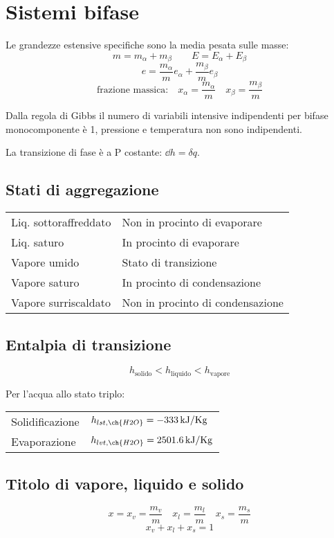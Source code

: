 \section{Sistemi bifase}

Le grandezze estensive specifiche sono la media pesata sulle masse:
\[m = m_\alpha + m_\beta \qquad E = E_\alpha + E_\beta\]
\[e = \frac{m_\alpha}{m}e_\alpha + \frac{m_\beta}{m}e_\beta\]
\[\text{frazione massica:} \quad x_\alpha = \frac{m_\alpha}{m} \quad x_\beta = \frac{m_\beta}{m} \]

Dalla regola di Gibbs il numero di variabili intensive indipendenti per bifase monocomponente è 1, pressione e temperatura non sono indipendenti.

La transizione di fase è a P costante: $\dd{h} = \delta q$.

\subsection{Stati di aggregazione}
\begin{tabular}{p{2.7cm}p{4.5cm}}
    Liq. sottoraffreddato & Non in procinto di evaporare \\
    Liq. saturo & In procinto di evaporare \\
    Vapore umido & Stato di transizione \\
    Vapore saturo & In procinto di condensazione \\
    Vapore surriscaldato & Non in procinto di condensazione \\
\end{tabular}

\subsection{Entalpia di transizione}

\[ h_\text{solido} < h_\text{liquido} < h_\text{vapore} \]

Per l'acqua allo stato triplo:
\begin{tabular}{ll}
    Solidificazione & $h_{lst,\ch{H2O}} = \SI{-333}{kJ/Kg}$ \\
    Evaporazione & $h_{lvt,\ch{H2O}} = \SI{2501.6}{kJ/Kg}$
\end{tabular}

\subsection{Titolo di vapore, liquido e solido}
\[ x = x_v = \frac{m_v}{m} \quad x_l = \frac{m_l}{m} \quad x_s = \frac{m_s}{m} \]
\[ x_v + x_l + x_s = 1 \]

